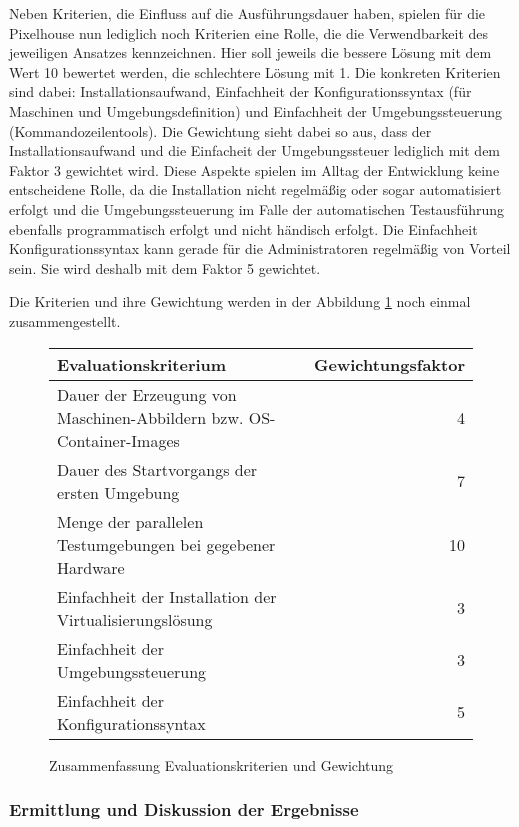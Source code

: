 Neben Kriterien, die Einfluss auf die Ausführungsdauer haben, spielen für die Pixelhouse nun lediglich noch Kriterien eine Rolle, die die Verwendbarkeit des jeweiligen Ansatzes kennzeichnen. Hier soll jeweils die bessere Lösung mit dem Wert 10 bewertet werden, die schlechtere Lösung mit 1. Die konkreten Kriterien sind dabei: Installationsaufwand, Einfachheit der Konfigurationssyntax (für Maschinen und Umgebungsdefinition) und Einfachheit der Umgebungssteuerung (Kommandozeilentools). Die Gewichtung sieht dabei so aus, dass der Installationsaufwand und die Einfacheit der Umgebungssteuer lediglich mit dem Faktor 3 gewichtet wird. Diese Aspekte spielen im Alltag der Entwicklung keine entscheidene Rolle, da die Installation nicht regelmäßig oder sogar automatisiert erfolgt und die Umgebungssteuerung im Falle der automatischen Testausführung ebenfalls programmatisch erfolgt und nicht händisch erfolgt. Die Einfachheit Konfigurationssyntax kann gerade für die Administratoren regelmäßig von Vorteil sein. Sie wird deshalb mit dem Faktor 5 gewichtet. 

Die Kriterien und ihre Gewichtung werden in der Abbildung \ref{kriterien} noch einmal zusammengestellt.

\begin{figure}[!ht]
  \begin{center}
    \resizebox{15cm}{!} {
      \begin{tabular}{|l|r|}
      \hline
      Evaluationskriterium & Gewichtungsfaktor \\
      \hline
      Dauer der Erzeugung von Maschinen-Abbildern bzw. OS-Container-Images & 4 \\
      \hline
      Dauer des Startvorgangs der ersten Umgebung & 7 \\
      \hline
      Menge der parallelen Testumgebungen bei gegebener Hardware & 10 \\
      \hline
      Einfachheit der Installation der Virtualisierungslösung & 3 \\
      \hline
      Einfachheit der Umgebungssteuerung & 3 \\      
      \hline
      Einfachheit der Konfigurationssyntax & 5 \\
      \hline
      \end{tabular}
    }
    \caption{Zusammenfassung Evaluationskriterien und Gewichtung}
    \label{kriterien}
  \end{center}
\end{figure}

\subsubsection{Ermittlung und Diskussion der Ergebnisse}

